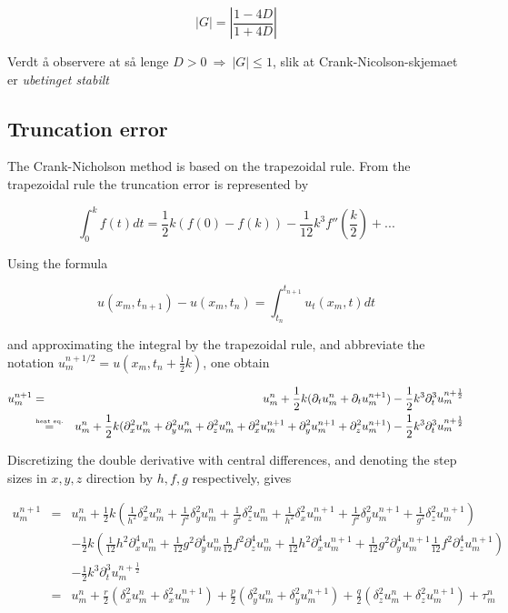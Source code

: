 \begin{equation}
|G| = \left|\frac{1-4D}{1+4D}\right|
\end{equation}

\noindent Verdt å observere at så lenge $D > 0 \ \Rightarrow \ |G| \le 1$, slik at Crank-Nicolson-skjemaet er \emph{ubetinget stabilt} 

\subsection{Truncation error}

The Crank-Nicholson method is based on the trapezoidal rule. From the trapezoidal rule the truncation error is represented by

\begin{equation*}
\int_0^k f(t) dt = \frac{1}{2} k (f(0) - f(k)) -\frac{1}{12} k^3 f''(\frac{k}{2}) + ...
\end{equation*}

\noindent Using the formula

\begin{equation*}
	u(x_m,t_{n+1}) - u(x_m,t_n) = \int_{t_n} ^{t_{n+1}} u_t(x_m,t) dt
\end{equation*}

and approximating the integral by the trapezoidal rule, and abbreviate the notation $u_m^{n+1/2} = u(x_m,t_n+\frac{1}{2} k)$, one obtain

\begin{eqnarray*}
u_m^ {n+1} &=& u_m^ n + \frac{1}{2} k(\partial_t u_m^n + \partial_t u_m^{n+1}) - \frac{1}{2} k^3 \partial_t ^3 u_m^{n+\frac{1}{2}} \\
		   &\stackrel{\text{\tiny heat eq.}}{=}&  u_m^ n + \frac{1}{2} k(\partial_x^2 u_m^n + \partial_y^2 u_m^n + \partial_z^2 u_m^n + \partial_x^2 u_m^{n+1} + \partial_y^2 u_m^{n+1} + \partial_z^2 u_m^{n+1}) - \frac{1}{2} k^3 \partial_t ^3 u_m^{n+\frac{1}{2}}
\end{eqnarray*}

Discretizing the double derivative with central differences, and denoting the step sizes in $x, y, z$ direction by $h, f, g$ respectively, gives

\begin{eqnarray*}
u_m^{n+1} &=&  u_m^ n + \frac{1}{2} k(\frac{1}{h^2}\delta_x^2 u_m^n + \frac{1}{f^2}\delta_y^2 u_m^n + \frac{1}{g^2}\delta_z^2 u_m^n + \frac{1}{h^2}\delta_x^2 u_m^{n+1} + \frac{1}{f^2}\delta_y^2 u_m^{n+1} + \frac{1}{g^2}\delta_z^2 u_m^{n+1}) \\
 		  &&- \frac{1}{2} k (\frac{1}{12}h^2\partial_x^4 u_m^n + \frac{1}{12}g^2\partial_y^4 u_m^n \frac{1}{12}f^2\partial_z^4 u_m^n + \frac{1}{12}h^2\partial_x^4 u_m^{n+1} + \frac{1}{12}g^2\partial_y^4 u_m^{n+1} \frac{1}{12}f^2\partial_z^4 u_m^{n+1} ) \\
 		  &&- \frac{1}{2} k^3 \partial_t ^3 u_m^{n+\frac{1}{2}} \\
 		  &=& u_m^n + \frac{r}{2}(\delta_x^2 u_m^n + \delta_x^2 u_m^{n+1}) + \frac{p}{2}(\delta_y^2 u_m^n + \delta_y^2 u_m^{n+1}) + \frac{q}{2}(\delta_z^2 u_m^n + \delta_z^2 u_m^{n+1}) + \tau_m^n
\end{eqnarray*}

